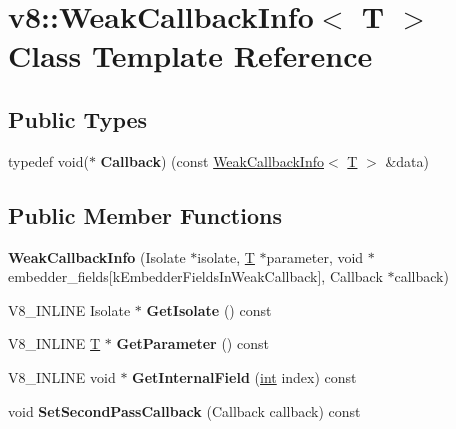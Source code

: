 \hypertarget{classv8_1_1WeakCallbackInfo}{}\section{v8\+:\+:Weak\+Callback\+Info$<$ T $>$ Class Template Reference}
\label{classv8_1_1WeakCallbackInfo}
\subsection*{Public Types}
\begin{DoxyCompactItemize}
\item 
\mbox{\label{classv8_1_1WeakCallbackInfo_a75f50fddcc9d5989e9cc04f8ab144d7d}} 
typedef void($\ast$ {\bfseries Callback}) (const \mbox{\hyperlink{classv8_1_1WeakCallbackInfo}{Weak\+Callback\+Info}}$<$ \mbox{\hyperlink{classv8_1_1internal_1_1torque_1_1T}{T}} $>$ \&data)
\end{DoxyCompactItemize}
\subsection*{Public Member Functions}
\begin{DoxyCompactItemize}
\item 
\mbox{\label{classv8_1_1WeakCallbackInfo_aabf19115b690b9baf1da8f440dfb3aa6}} 
{\bfseries Weak\+Callback\+Info} (Isolate $\ast$isolate, \mbox{\hyperlink{classv8_1_1internal_1_1torque_1_1T}{T}} $\ast$parameter, void $\ast$embedder\+\_\+fields\mbox{[}k\+Embedder\+Fields\+In\+Weak\+Callback\mbox{]}, Callback $\ast$callback)
\item 
\mbox{\label{classv8_1_1WeakCallbackInfo_a4cc354ee04d52d5ab880f1e9f85966c1}} 
V8\+\_\+\+I\+N\+L\+I\+NE Isolate $\ast$ {\bfseries Get\+Isolate} () const
\item 
\mbox{\label{classv8_1_1WeakCallbackInfo_a7fcf0d86f88eb066967de3c0e4a77ed4}} 
V8\+\_\+\+I\+N\+L\+I\+NE \mbox{\hyperlink{classv8_1_1internal_1_1torque_1_1T}{T}} $\ast$ {\bfseries Get\+Parameter} () const
\item 
\mbox{\label{classv8_1_1WeakCallbackInfo_a00732c95f8c130fba45ee6bbb3d3d819}} 
V8\+\_\+\+I\+N\+L\+I\+NE void $\ast$ {\bfseries Get\+Internal\+Field} (\mbox{\hyperlink{classint}{int}} index) const
\item 
\mbox{\label{classv8_1_1WeakCallbackInfo_af0f671ce037ff91319683e8f01645865}} 
void {\bfseries Set\+Second\+Pass\+Callback} (Callback callback) const
\end{DoxyCompactItemize}


